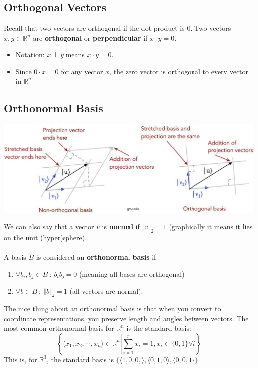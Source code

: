 \documentclass[10pt]{article}
\begin{document}
\subsection*{Orthogonal Vectors}
Recall that two vectors are orthogonal if the dot product is $0$.  Two vectors $x, y \in \mathbb{R}^n$ are \textbf{orthogonal} or \textbf{perpendicular} if $x \cdot y = 0$.
\begin{itemize}
	\item Notation: $x \perp y$ means $x \cdot y = 0$.
	\item Since $0 \cdot x = 0$ for any vector $x$, the zero vector is orthogonal to every vector in $\mathbb{R}^n$
\end{itemize}

\subsection*{Orthonormal Basis}
\begin{center}
    \includegraphics[width=\textwidth]{M9_1.png}
\end{center}
We can also say that a vector $v$ is \textbf{normal} if $\Vert v \Vert_2 = 1$ (graphically it means it lies on the unit (hyper)sphere).\\\\
A basis $B$ is considered an \textbf{orthonormal basis} if 
\begin{enumerate}
	\item $\forall b_i, b_j \in B \::\: b_i b_j = 0$ (meaning all bases are orthogonal)
	\item $\forall b \in B \::\: \Vert b \Vert_2 = 1$ (all vectors are normal).
\end{enumerate}
The nice thing about an orthonormal basis is that when you convert to coordinate representations, you preserve length and angles between vectors.  The most common orthonormal basis for $\mathbb{R}^n$ is the standard basis:
\[\left\{\langle x_1, x_2, \cdots, x_n \rangle \in \mathbb{R}^n \left| \sum_{i = 1}^n x_i = 1, x_i \in \{0, 1\} \forall i \right.\right\}\]
This is, for $\mathbb{R}^3$, the standard basis is $\{\langle 1, 0, 0, \rangle, \langle 0, 1, 0 \rangle, \langle 0, 0, 1 \rangle\}$
\end{document}

